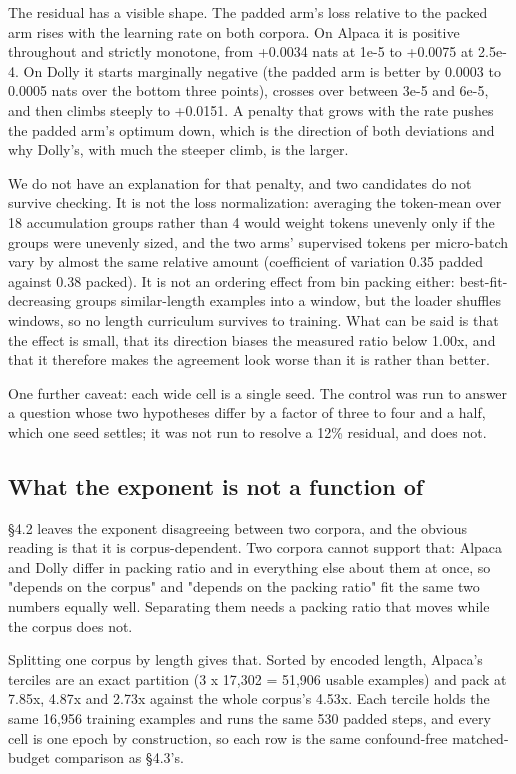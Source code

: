 \documentclass[11pt]{article}
\begin{document}
The residual has a visible shape. The padded arm's loss relative to the packed arm rises with the learning rate on both corpora. On Alpaca it is positive throughout and strictly monotone, from +0.0034 nats at 1e-5 to +0.0075 at 2.5e-4. On Dolly it starts marginally negative (the padded arm is better by 0.0003 to 0.0005 nats over the bottom three points), crosses over between 3e-5 and 6e-5, and then climbs steeply to +0.0151. A penalty that grows with the rate pushes the padded arm's optimum down, which is the direction of both deviations and why Dolly's, with much the steeper climb, is the larger.

We do not have an explanation for that penalty, and two candidates do not survive checking. It is not the loss normalization: averaging the token-mean over 18 accumulation groups rather than 4 would weight tokens unevenly only if the groups were unevenly sized, and the two arms' supervised tokens per micro-batch vary by almost the same relative amount (coefficient of variation 0.35 padded against 0.38 packed). It is not an ordering effect from bin packing either: best-fit-decreasing groups similar-length examples into a window, but the loader shuffles windows, so no length curriculum survives to training. What can be said is that the effect is small, that its direction biases the measured ratio below 1.00x, and that it therefore makes the agreement look worse than it is rather than better.

One further caveat: each wide cell is a single seed. The control was run to answer a question whose two hypotheses differ by a factor of three to four and a half, which one seed settles; it was not run to resolve a 12\% residual, and does not.

\subsection{What the exponent is not a function of}

\S{}4.2 leaves the exponent disagreeing between two corpora, and the obvious reading is that it is corpus-dependent. Two corpora cannot support that: Alpaca and Dolly differ in packing ratio and in everything else about them at once, so "depends on the corpus" and "depends on the packing ratio" fit the same two numbers equally well. Separating them needs a packing ratio that moves while the corpus does not.

Splitting one corpus by length gives that. Sorted by encoded length, Alpaca's terciles are an exact partition (3 x 17,302 = 51,906 usable examples) and pack at 7.85x, 4.87x and 2.73x against the whole corpus's 4.53x. Each tercile holds the same 16,956 training examples and runs the same 530 padded steps, and every cell is one epoch by construction, so each row is the same confound-free matched-budget comparison as \S{}4.3's.
\end{document}
